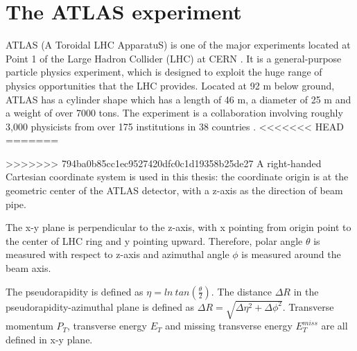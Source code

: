 \chapter{The ATLAS experiment}

\label{ch:atlas}
\par ATLAS (A Toroidal LHC ApparatuS) is one of the major experiments located at Point 1 of the Large Hadron Collider (LHC) at CERN \cite{Aad:2008zzm}. 
It is a general-purpose particle physics experiment, which is designed to exploit the huge range of physics opportunities that the LHC provides. 
		Located at 92 m below ground, ATLAS has a cylinder shape which has a length of 46 m, a diameter of 25 m and a weight of over 7000 tons.
 The experiment is a collaboration involving roughly 3,000 physicists from over 175 institutions in 38 countries \cite{fact}.
<<<<<<< HEAD
=======

>>>>>>> 794ba0b85cc1ec9527420dfc0c1d19358b25de27
A right-handed Cartesian coordinate system is used in this thesis: the coordinate origin is at the geometric center of the ATLAS detector, with a z-axis as 
the direction of beam pipe.
\par The x-y plane is perpendicular to the z-axis, with x pointing from origin point to the center 
of LHC ring and y pointing upward. Therefore, polar angle $\theta$ is measured with respect to z-axis and azimuthal angle $\phi$ is measured around the beam axis. 
\par The pseudorapidity is defined as $\eta = ln~tan(\frac{\theta}{2})$. The distance $\Delta R$ in the pseudorapidity-azimuthal plane is defined as 
$\Delta R = \sqrt{\Delta\eta^2 + \Delta\phi^2}$. Transverse momentum $P_T$, transverse energy $E_T$ and missing transverse energy $E_T^{miss}$ are all defined in x-y plane.				


